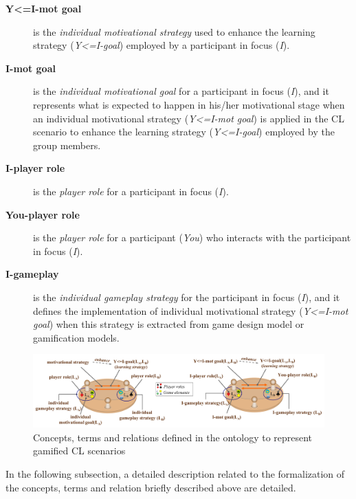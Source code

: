 \begin{description}
\item[\textbf{Y<=I-mot goal}]
is the \emph{individual motivational strategy} used to enhance the learning strategy (\emph{Y<=I-goal}) employed by a participant in focus (\emph{I}).

\item[\textbf{I-mot goal}]
is the \emph{individual motivational goal} for a participant in focus (\emph{I}), and it represents what is expected to happen in his/her motivational stage when an individual motivational strategy (\emph{Y<=I-mot goal}) is applied in the CL scenario to enhance the learning strategy (\emph{Y<=I-goal}) employed by the group members.

\item[\textbf{I-player role}]
is the \emph{player role} for a participant in focus (\emph{I}).

\item[\textbf{You-player role}]
is the \emph{player role} for a participant (\emph{You}) who interacts with the participant in focus (\emph{I}).

\item[\textbf{I-gameplay}]
is the \emph{individual gameplay strategy} for the participant in focus (\emph{I}), and it defines the implementation of individual motivational strategy (\emph{Y<=I-mot goal}) when this strategy is extracted from game design model or gamification models.
\end{description}

\begin{figure}[htb]
 \caption{Concepts, terms and relations defined in the ontology to represent gamified CL scenarios}
 \label{fig:concepts-terms-and-relation-in-gamified-cl-scenarios}
 \centering
 \includegraphics[width=1\textwidth]{images/chap-ontogacles1/concepts-terms-and-relation-in-gamified-cl-scenarios.png}
 \fautor
\end{figure}

In the following subsection, a detailed description related to the formalization of the concepts, terms and relation briefly described above are detailed.

